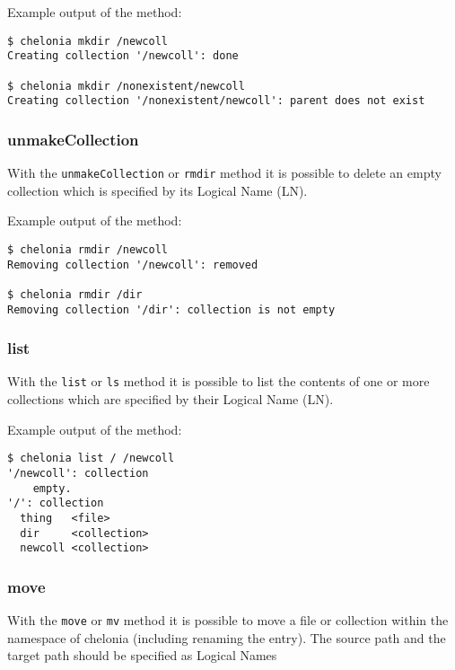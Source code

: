 Example output of the method:
\begin{verbatim}
$ chelonia mkdir /newcoll
Creating collection '/newcoll': done

$ chelonia mkdir /nonexistent/newcoll
Creating collection '/nonexistent/newcoll': parent does not exist
\end{verbatim}

\subsubsection{unmakeCollection} %
\label{ssub:unmakecollection}
With the \texttt{unmakeCollection} or \texttt{rmdir} method it is possible to delete an empty collection which is specified by its Logical Name (LN).
\hspace*{0.5cm}
\begin{shaded}
\end{shaded}

Example output of the method:
\begin{verbatim}
$ chelonia rmdir /newcoll
Removing collection '/newcoll': removed

$ chelonia rmdir /dir
Removing collection '/dir': collection is not empty
\end{verbatim}

\subsubsection{list} %
\label{ssub:list}
With the \texttt{list} or \texttt{ls} method it is possible to list the contents of one or more collections which are specified by their Logical Name (LN).
\hspace*{0.5cm}
\begin{shaded}
\end{shaded}

Example output of the method:
\begin{verbatim}
$ chelonia list / /newcoll
'/newcoll': collection
    empty.
'/': collection
  thing   <file>
  dir     <collection>
  newcoll <collection>
\end{verbatim}

\subsubsection{move} %
\label{ssub:move}
With the \texttt{move} or \texttt{mv} method it is possible to move a file or collection within the namespace of chelonia (including renaming the entry). The source path and the target path should be specified as Logical Names
\hspace*{0.5cm}
\begin{shaded}
\end{shaded}

